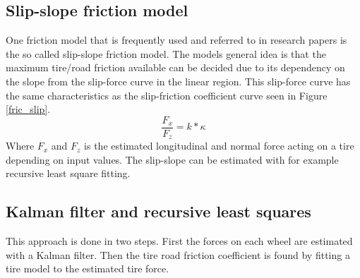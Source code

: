 \subsection{Slip-slope friction model}

One friction model that is frequently used and referred to in research papers is the so called slip-slope friction model. The models general idea is that the maximum tire/road friction available can be decided due to its dependency on the slope from the slip-force curve in the linear region. This slip-force curve has the same characteristics as the slip-friction coefficient curve seen in Figure \ref{fric_slip}. 
\begin{equation}
	\dfrac{F_{x}}{F_{z}} = k*\kappa
\end{equation}
Where $ F_{x} $ and $ F_{z} $ is the estimated longitudinal and normal force acting on a tire depending on input values. The slip-slope can be estimated with for example recursive least square fitting.


\subsection{Kalman filter and recursive least squares}
This approach is done in two steps. First the forces on each wheel are estimated with a Kalman filter. Then the tire road friction coefficient is found by fitting a tire model to the estimated tire force.